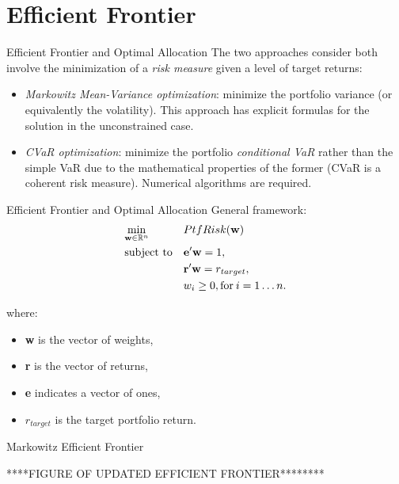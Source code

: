 \documentclass{beamer}
\begin{document}
\section{Efficient Frontier}

\begin{frame}{Efficient  Frontier and Optimal Allocation}
The two approaches consider both involve the minimization of a \textit{risk measure} given a level of target returns:
\begin{itemize}
	\item \textit{Markowitz Mean-Variance optimization}:  minimize the portfolio variance (or equivalently the volatility). This approach has explicit formulas for the solution in the unconstrained case.
	\item \textit{CVaR optimization}: minimize the portfolio \textit{conditional VaR} rather than the simple VaR due to the mathematical properties of the former (CVaR is a coherent risk measure). Numerical algorithms are required.
\end{itemize}
\end{frame}


\begin{frame}{Efficient  Frontier and Optimal Allocation}
General framework:
\begin{subequations}
	\begin{align}
	&\!\min_{\mathbf{w}\in \mathbb{R}^{n}}        & & PtfRisk(\mathbf{w}) \notag\\
	& \text{subject to} &      & \mathbf{e}'\mathbf{w} = 1 , \notag\\
	&                  &      & \mathbf{r}'\mathbf{w} = r_{target},\label{eq:constraint2} \notag\\
	&		 &        & w_{i} \geq 0, \text{for} \: i = 1\dots n. \notag
	\end{align}
\end{subequations}

where:
\begin{itemize}
	\item \textbf{w} is the vector of weights,
	\item \textbf{r} is the vector of returns,
	\item \textbf{e} indicates a vector of ones,
	\item $r_{target}$ is the target portfolio return.
\end{itemize}
\end{frame}

\begin{frame}{Markowitz Efficient Frontier}

****FIGURE OF UPDATED EFFICIENT FRONTIER********
\end{frame}
\end{document}
